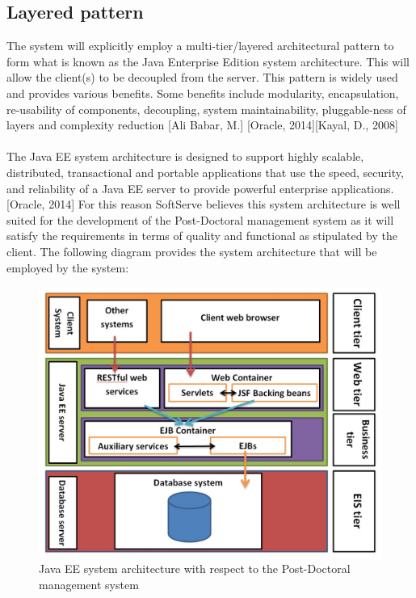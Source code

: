 \documentclass[12pt]{article}
\begin{document}
\subsection{Layered pattern}
The system will explicitly employ a multi-tier/layered architectural pattern to form what is known as the Java Enterprise Edition system architecture. This will allow the client(s) to be decoupled from the server. This pattern is widely used and provides various benefits. Some benefits include modularity, encapsulation, re-usability of components, decoupling, system maintainability, pluggable-ness of layers and complexity reduction [Ali Babar, M.] [Oracle, 2014][Kayal, D., 2008]\\
\\
The Java EE system architecture is designed to support highly scalable, distributed, transactional and portable applications that use the speed, security, and reliability of a Java EE server to provide powerful enterprise applications. [Oracle, 2014] For this reason SoftServe believes this system architecture is well suited for the development of the Post-Doctoral management system as it will satisfy the requirements in terms of quality and functional as stipulated by the client. The following diagram provides the system architecture that will be employed by the system:\\

\begin{figure}[H]
\centering
\includegraphics[scale=0.6]{../Images_Docs/Diagrams/Architecture/Java EE system architecture.jpg}
\caption{Java EE system architecture with respect to the Post-Doctoral management system}
\end{figure}
\end{document}
